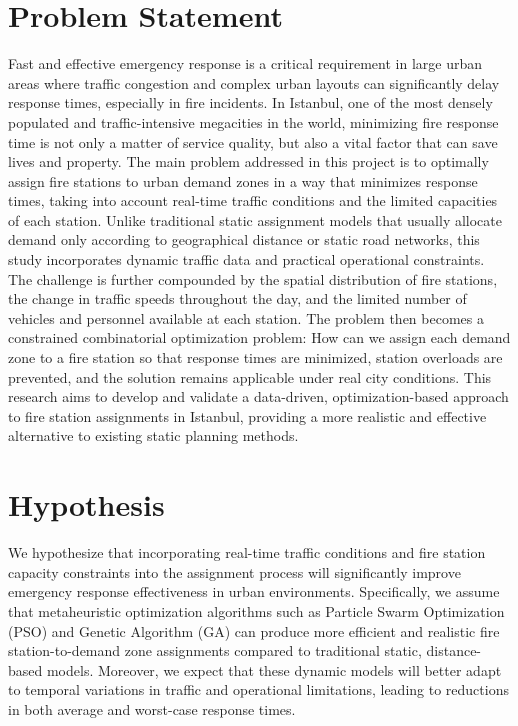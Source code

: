 \documentclass[conference]{IEEEtran}
\begin{document}
\section*{\textbf{Problem Statement}}
Fast and effective emergency response is a critical requirement in large urban areas where traffic congestion and complex urban layouts can significantly delay response times, especially in fire incidents. In Istanbul, one of the most densely populated and traffic-intensive megacities in the world, minimizing fire response time is not only a matter of service quality, but also a vital factor that can save lives and property. The main problem addressed in this project is to optimally assign fire stations to urban demand zones in a way that minimizes response times, taking into account real-time traffic conditions and the limited capacities of each station. Unlike traditional static assignment models that usually allocate demand only according to geographical distance or static road networks, this study incorporates dynamic traffic data and practical operational constraints. The challenge is further compounded by the spatial distribution of fire stations, the change in traffic speeds throughout the day, and the limited number of vehicles and personnel available at each station. The problem then becomes a constrained combinatorial optimization problem: How can we assign each demand zone to a fire station so that response times are minimized, station overloads are prevented, and the solution remains applicable under real city conditions. This research aims to develop and validate a data-driven, optimization-based approach to fire station assignments in Istanbul, providing a more realistic and effective alternative to existing static planning methods.
\section*{\textbf{Hypothesis}}

We hypothesize that incorporating real-time traffic conditions and fire station capacity constraints into the assignment process will significantly improve emergency response effectiveness in urban environments. Specifically, we assume that metaheuristic optimization algorithms such as Particle Swarm Optimization (PSO) and Genetic Algorithm (GA) can produce more efficient and realistic fire station-to-demand zone assignments compared to traditional static, distance-based models. Moreover, we expect that these dynamic models will better adapt to temporal variations in traffic and operational limitations, leading to reductions in both average and worst-case response times.
\end{document}
